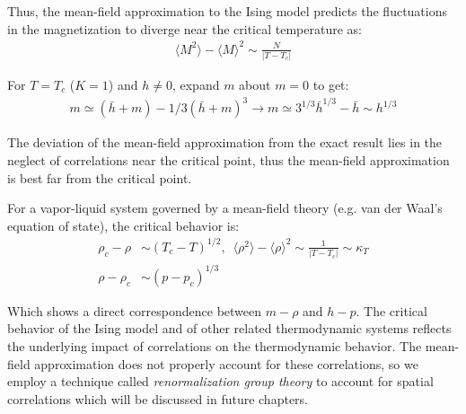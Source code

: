 \documentclass[book.tex]{subfiles}
\begin{document}
Thus, the mean-field approximation to the Ising model predicts the fluctuations in the magnetization to diverge near the critical temperature as:
\begin{align}
\langle M^{2} \rangle - \langle M \rangle^{2} \sim \frac{N}{|T-T_c|}
\end{align}

For $T = T_c$ ($K = 1$) and $h \neq 0$, expand $m$ about $m = 0$ to get:
\begin{align}
m \simeq (\bar{h}+m) - 1/3(\bar{h}+m)^{3} \rightarrow m \simeq 3^{1/3}\bar{h}^{1/3} - \bar{h} \sim h^{1/3}
\end{align}

The deviation of the mean-field approximation from the exact result lies in the neglect of correlations near the critical point, thus the mean-field approximation is best far from the critical point.

For a vapor-liquid system governed by a mean-field theory (e.g. van der Waal's equation of state), the critical behavior is:
\begin{align}
\rho_c - \rho &\sim (T_c-T)^{1/2},\,\,\,\langle \rho^{2} \rangle - \langle \rho \rangle^{2} \sim \frac{1}{|T-T_c|} \sim \kappa_T  \\
\rho - \rho_c &\sim (p-p_c)^{1/3}
\end{align}

Which shows a direct correspondence between $m-\rho$ and $h-p$. The critical behavior of the Ising model and of other related thermodynamic systems reflects the underlying impact of correlations on the thermodynamic behavior. The mean-field approximation does not properly account for these correlations, so we employ a technique called \textit{renormalization group theory} to account for spatial correlations which will be discussed in future chapters.
\end{document}
